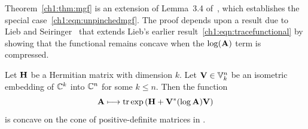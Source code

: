 
Theorem~\ref{ch1:thm:mgf} is an extension of Lemma~3.4 of~\cite{T10a}, which
establishes the special case~\eqref{ch1:eqn:unpinchedmgf}. The proof depends upon a
result due to Lieb and Seiringer~\cite[Thm.~3]{LS05} that extends Lieb's
earlier result~\eqref{ch1:eqn:tracefunctional} by showing that the functional remains
concave when the $\log(\mathbf{A})$ term is compressed.

\begin{prop}
Let $\mathbf{H}$ be a Hermitian matrix with dimension $k.$ Let $\mathbf{V} \in
\mathbb{V}_{k}^{n}$ be an isometric embedding of $\mathbb{C}^k$ into $\mathbb{C}^n$ for some $k \leq
n.$ Then the function
\begin{equation*}
 \mathbf{A} \longmapsto \operatorname{tr}\mathrm{exp}\left(\mathbf{H} + \mathbf{V}^* (\log\mathbf{A}) \mathbf{V}\right)
\end{equation*}
is concave on the cone of positive-definite matrices in .
 \label{ch1:prop:pinchedtracefunctional}
\end{prop}

